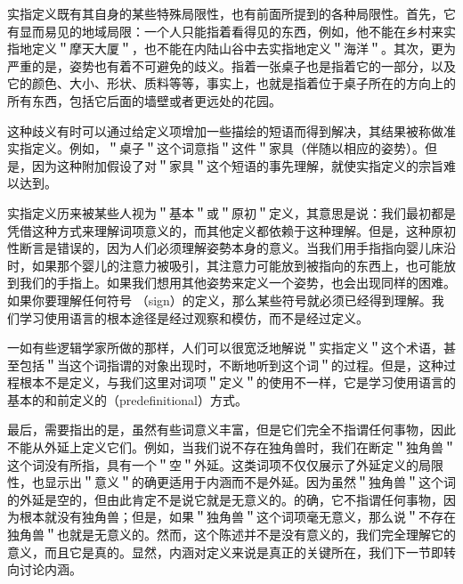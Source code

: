 实指定义既有其自身的某些特殊局限性，也有前面所提到的各种局限性。首先，它有显而易见的地域局限：一个人只能指着看得见的东西，例如，他不能在乡村来实指地定义＂摩天大厦＂，也不能在内陆山谷中去实指地定义＂海洋＂。其次，更为严重的是，姿势也有着不可避免的歧义。指着一张桌子也是指着它的一部分，以及它的颜色、大小、形状、质料等等，事实上，也就是指着位于桌子所在的方向上的所有东西，包括它后面的墙壁或者更远处的花园。

这种歧义有时可以通过给定义项增加一些描绘的短语而得到解决，其结果被称做准实指定义。例如，＂桌子＂这个词意指＂这件＂家具（伴随以相应的姿势）。但是，因为这种附加假设了对＂家具＂这个短语的事先理解，就使实指定义的宗旨难以达到。

实指定义历来被某些人视为＂基本＂或＂原初＂定义，其意思是说：我们最初都是凭借这种方式来理解词项意义的，而其他定义都依赖于这种理解。但是，这种原初性断言是错误的，因为人们必须理解姿勢本身的意义。当我们用手指指向婴儿床沿时，如果那个婴儿的注意力被吸引，其注意力可能放到被指向的东西上，也可能放到我们的手指上。如果我们想用其他姿势来定义一个姿势，也会出现同样的困难。如果你要理解任何符号 （sign）的定义，那么某些符号就必须已经得到理解。我们学习使用语言的根本途径是经过观察和模仿，而不是经过定义。

一如有些逻辑学家所做的那样，人们可以很宽泛地解说＂实指定义＂这个术语，甚至包括＂当这个词指谓的对象出现时，不断地听到这个词＂的过程。但是，这种过程根本不是定义，与我们这里对词项＂定义＂的使用不一样，它是学习使用语言的基本的和前定义的（predefinitional）方式。

最后，需要指出的是，虽然有些词意义丰富，但是它们完全不指谓任何事物，因此不能从外延上定义它们。例如，当我们说不存在独角兽时，我们在断定＂独角兽＂这个词没有所指，具有一个＂空＂外延。这类词项不仅仅展示了外延定义的局限性，也显示出＂意义＂的确更适用于内涵而不是外延。因为虽然＂独角兽＂这个词的外延是空的，但由此肯定不是说它就是无意义的。的确，它不指谓任何事物，因为根本就没有独角兽；但是，如果＂独角兽＂这个词项毫无意义，那么说＂不存在独角兽＂也就是无意义的。然而，这个陈述并不是没有意义的，我们完全理解它的意义，而且它是真的。显然，内涵对定义来说是真正的关键所在，我们下一节即转向讨论内涵。 